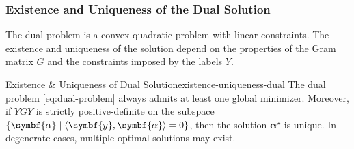 \subsubsection{Existence and Uniqueness of the Dual Solution}
The dual problem is a convex quadratic problem with linear constraints.
The existence and uniqueness of the solution depend on the properties of the Gram matrix $G$ and the constraints imposed by the labels $Y$.

\begin{theorem}{Existence \& Uniqueness of Dual Solution}{existence-uniqueness-dual}
	The dual problem \eqref{eq:dual-problem} always admits at least one global minimizer. Moreover, if $YGY$ is strictly positive-definite on the subspace $\{\symbf{\alpha}\mid \inner{\symbf{y}, \symbf{\alpha}}=0\}$, then the solution $\symbf{\alpha}^\star$ is unique. In degenerate cases, multiple optimal solutions may exist.
\end{theorem}

